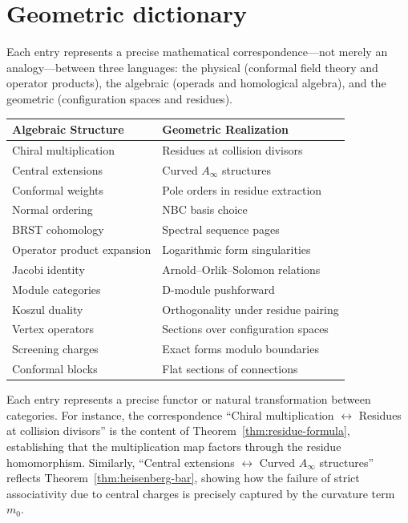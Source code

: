 \chapter{Geometric dictionary}


Each entry represents a precise mathematical correspondence---not merely an analogy---between three languages: the physical (conformal field theory and operator products), the algebraic (operads and homological algebra), and the geometric (configuration spaces and residues).

\begin{center}
\begin{tabular}{|l|l|}
\hline
\textbf{Algebraic Structure} & \textbf{Geometric Realization} \\
\hline
Chiral multiplication & Residues at collision divisors \\
Central extensions & Curved $A_\infty$ structures \\
Conformal weights & Pole orders in residue extraction \\
Normal ordering & NBC basis choice \\
BRST cohomology & Spectral sequence pages \\
Operator product expansion & Logarithmic form singularities \\
Jacobi identity & Arnold--Orlik--Solomon relations \\
Module categories & D-module pushforward \\
Koszul duality & Orthogonality under residue pairing \\
Vertex operators & Sections over configuration spaces \\
Screening charges & Exact forms modulo boundaries \\
Conformal blocks & Flat sections of connections \\
\hline
\end{tabular}
\end{center}

\begin{remark}
Each entry represents a precise functor or natural transformation between categories. For instance, the correspondence ``Chiral multiplication $\leftrightarrow$ Residues at collision divisors'' is the content of Theorem~\ref{thm:residue-formula}, establishing that the multiplication map factors through the residue homomorphism. Similarly, ``Central extensions $\leftrightarrow$ Curved $A_\infty$ structures'' reflects Theorem~\ref{thm:heisenberg-bar}, showing how the failure of strict associativity due to central charges is precisely captured by the curvature term $m_0$.
\end{remark}



